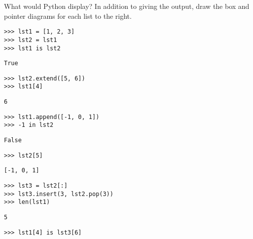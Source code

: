 \question
What would Python display? In addition to giving the output,
draw the box and pointer diagrams for each list to the right.

\begin{lstlisting}
>>> lst1 = [1, 2, 3]
>>> lst2 = lst1
>>> lst1 is lst2
\end{lstlisting}

\begin{solution}[.2in]
\begin{lstlisting}
True
\end{lstlisting}
\end{solution}

\begin{lstlisting}
>>> lst2.extend([5, 6])
>>> lst1[4]
\end{lstlisting}

\begin{solution}[.2in]
\begin{lstlisting}
6
\end{lstlisting}
\end{solution}

\begin{lstlisting}
>>> lst1.append([-1, 0, 1])
>>> -1 in lst2
\end{lstlisting}

\begin{solution}[.2in]
\begin{lstlisting}
False
\end{lstlisting}
\end{solution}

\begin{lstlisting}
>>> lst2[5]
\end{lstlisting}

\begin{solution}[.2in]
\begin{lstlisting}
[-1, 0, 1]
\end{lstlisting}
\end{solution}

\begin{lstlisting}
>>> lst3 = lst2[:]
>>> lst3.insert(3, lst2.pop(3))
>>> len(lst1)
\end{lstlisting}

\begin{solution}[.2in]
\begin{lstlisting}
5
\end{lstlisting}
\end{solution}

\begin{lstlisting}
>>> lst1[4] is lst3[6]
\end{lstlisting}

